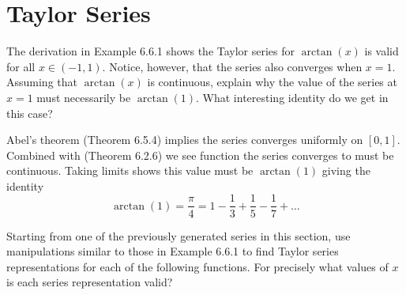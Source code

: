 \section{Taylor Series}

\begin{exercise}
  The derivation in Example 6.6.1 shows the Taylor series for $\arctan (x)$ is valid for all $x \in(-1,1)$. Notice, however, that the series also converges when $x=1$. Assuming that $\arctan(x)$ is continuous, explain why the value of the series at $x=1$ must necessarily be $\arctan(1)$. What interesting identity do we get in this case?

\end{exercise}
\begin{solution}
  Abel's theorem (Theorem 6.5.4) implies the series converges uniformly on $[0, 1]$.
  Combined with (Theorem 6.2.6) we see function the series converges to must be continuous.
  Taking limits shows this value must be $\arctan(1)$ giving the identity
  $$
  \arctan(1) = \frac{\pi}{4} = 1 - \frac 13 + \frac 15 - \frac 17 + \dots
  $$
\end{solution}
\begin{exercise}
  Starting from one of the previously generated series in this section, use manipulations similar to those in Example 6.6.1 to find Taylor series representations for each of the following functions. For precisely what values of $x$ is each series representation valid?
\end{exercise}
